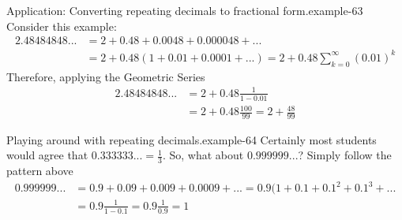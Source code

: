 \documentclass[10pt,]{book}
\numberwithin{equation}{section}
\begin{document}
\begin{example}{Application: Converting repeating decimals to fractional form.}{example-63}%
\hypertarget{p-1532}{}%
Consider this example:%
%
\begin{align*}
2.48484848... & = 2 + 0.48 + 0.0048 + 0.000048 + ...\\
&  = 2 + 0.48(1 + 0.01 + 0.0001 + ... ) = 2 + 0.48 \sum_{k=0}^\infty (0.01)^k
\end{align*}
\hypertarget{p-1533}{}%
Therefore, applying the Geometric Series%
%
\begin{align*}
2.48484848... & = 2 + 0.48 \frac{1}{1-0.01} \\
& = 2 + 0.48 \frac{100}{99} = 2 + \frac{48}{99} 
\end{align*}
\end{example}
\begin{example}{Playing around with repeating decimals.}{example-64}%
\hypertarget{p-1534}{}%
Certainly most students would agree that \(0.333333... = \frac{1}{3} \). So, what about \(0.999999...\)? Simply follow the pattern above%
%
\begin{align*}
0.999999... & = 0.9 + 0.09 + 0.009 + 0.0009 + ... = 0.9(1 + 0.1 + 0.1^2 + 0.1^3 + ...\\
& = 0.9 \frac{1}{1-0.1} = 0.9 \frac{1}{0.9} = 1 
\end{align*}
\end{example}
%
%
\typeout{************************************************}
\typeout{************************************************}
%
\end{document}
